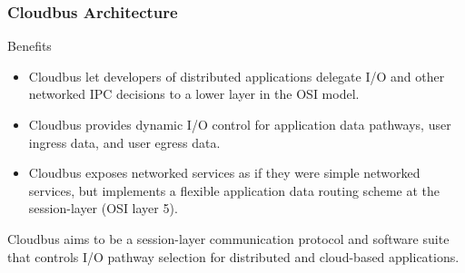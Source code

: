 \begin{frame}
	\frametitle{Cloudbus Architecture}
	\begin{block}{Benefits}
		\begin{itemize}
			\item Cloudbus let developers of distributed applications delegate I/O and other networked IPC decisions to a lower layer in the %
			OSI model.
			\item Cloudbus provides dynamic I/O control for application data pathways, user ingress data, and user egress data.
			\item Cloudbus exposes networked services as if they were simple networked services, but implements a flexible application data %
			routing scheme at the session-layer (OSI layer 5).
		\end{itemize}
		Cloudbus aims to be a session-layer communication protocol and software suite that controls I/O pathway selection for distributed %
		and cloud-based applications. 
	\end{block}
\end{frame}